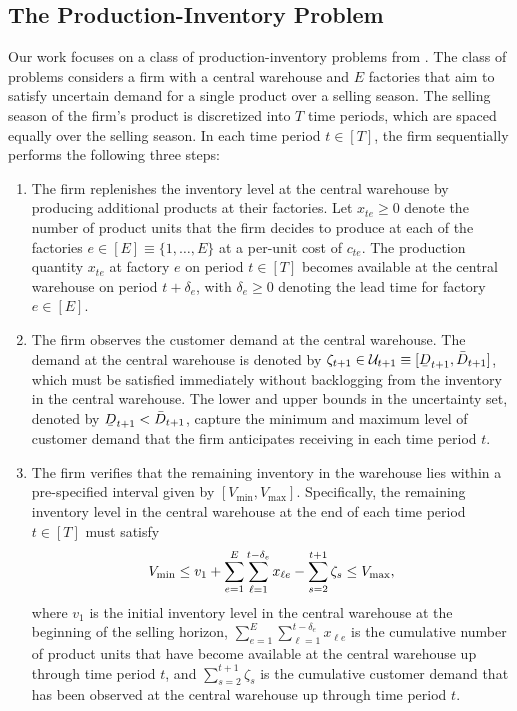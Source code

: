 \documentclass[nonblindrev,mnsc]{informs3} %
\newcommand{\ubar}[1]{\text{\b{$#1$}}}
\begin{document}
\subsection{The Production-Inventory Problem} \label{sec:prodinv}
Our work focuses on a class of production-inventory problems from \cite{ben2004adjustable}.  
The class of problems considers a firm with a central warehouse and $E$ factories that aim to satisfy uncertain demand for a single product over a selling season.  The selling season of the firm's product is discretized into $T$ time periods, which are spaced equally over the selling season. 
 In each time period $t \in [T]$,  the firm sequentially performs the following three steps:
 \begin{enumerate}
     \item The firm replenishes the inventory level at the central warehouse by producing additional products at their  factories.  Let  $x_{te} \ge 0$ denote the number of product units that the firm decides to produce at each of the factories $e \in [E] \equiv \{1,\ldots,E\}$ at a per-unit cost of $c_{te}$. The production quantity $x_{te}$ at factory $e$ on period $t \in [T]$ becomes available at the central warehouse on period $t + \delta_e$, with $\delta_e \ge 0$ denoting the lead time for factory $e \in [E]$. 
     \item The firm observes the customer demand  at the central warehouse. The demand at the central warehouse is denoted by $\zeta_{t+1} \in \mathcal{U}_{t+1} \equiv [\ubar{D}_{t+1},\bar{D}_{t+1}]$, which must be satisfied immediately without backlogging from the inventory in  the central warehouse. The lower and upper bounds in the uncertainty set, denoted by  $\ubar{D}_{t+1} < \bar{D}_{t+1}$, capture the minimum and maximum level of customer demand that the firm anticipates  receiving in each time period $t$.
          \item The firm verifies that the remaining  inventory  in the warehouse lies within a  pre-specified interval given by  $[V_{\text{min}}, V_{\text{max}}]$. %
          Specifically, the remaining inventory level in the central warehouse at the end of each time period $t \in [T]$ must satisfy
 \begin{align*}
   V_{\textnormal{min}} \le v_1 + \sum_{e=1}^E \sum_{\ell=1}^{t-\delta_e}   x_{\ell e} - \sum_{s=2}^{t+1} \zeta_s \le  V_{\textnormal{max}},
 \end{align*}
 where $v_1$ is the initial inventory level in the central warehouse at the beginning of the selling horizon,  $\sum_{e=1}^E \sum_{\ell=1}^{t-\delta_e}   x_{\ell e}$ is the cumulative number of product units that have become available at the central warehouse up through time period $t$, and $\sum_{s=2}^{t+1} \zeta_s$ is the cumulative customer demand that has been observed at the central warehouse up through time period $t$.
 \end{enumerate}
\end{document}
